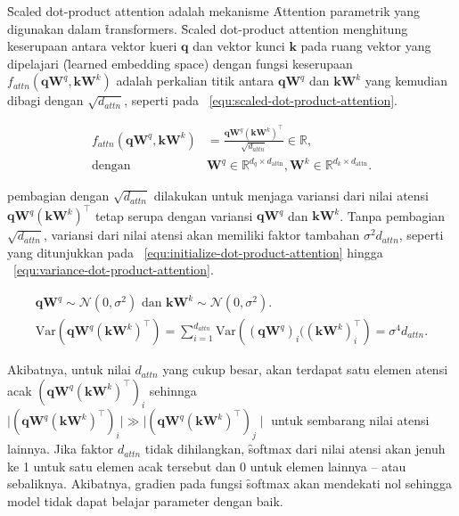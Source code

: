 	\f{Scaled dot-product attention} adalah mekanisme \f{Attention} parametrik yang digunakan dalam \f{transformers}. \f{Scaled dot-product attention} menghitung keserupaan antara vektor kueri $\mathbf{q}$ dan vektor kunci $\mathbf{k}$ pada ruang vektor yang dipelajari (\f{learned embedding space}) dengan fungsi keserupaan $f_{attn}(\mathbf{q} \mathbf{W}^q, \mathbf{k}\mathbf{W}^k) $ adalah perkalian titik antara $\mathbf{qW}^q$ dan $\mathbf{kW}^k$ yang kemudian dibagi dengan $\sqrt{d_{attn}}$, seperti pada \equ~\ref{equ:scaled-dot-product-attention}.

	\begin{align}
		\label{equ:scaled-dot-product-attention}
		f_{attn}(\mathbf{q} \mathbf{W}^q, \mathbf{k} \mathbf{W}^k) &= \frac{\mathbf{q} \mathbf{W}^q (\mathbf{k} \mathbf{W}^k)^{\top}}{\sqrt{d_{attn}}} \in \mathbb{R}, \\
		\text{dengan } &\mathbf{W}^q \in \mathbb{R}^{d_q \times d_{\text{attn}}}, \mathbf{W}^k \in \mathbb{R}^{d_k \times d_{\text{attn}}}.
	\end{align}

	pembagian dengan $\sqrt{d_{attn}}$ dilakukan untuk menjaga variansi dari nilai atensi $\mathbf{q} \mathbf{W}^q (\mathbf{k} \mathbf{W}^k)^{\top}$ tetap serupa dengan variansi $\mathbf{qW}^q$ dan $\mathbf{kW}^k$. Tanpa pembagian $\sqrt{d_{attn}}$, variansi dari nilai atensi akan memiliki faktor tambahan $\sigma^2 d_{attn}$, seperti yang ditunjukkan pada \equ~\ref{equ:initialize-dot-product-attention} hingga \equ~\ref{equ:variance-dot-product-attention}.

	\begin{align}
		\label{equ:initialize-dot-product-attention}
		\mathbf{qW}^q \sim \mathcal{N}(0, \sigma^2) \text{ dan } \mathbf{kW}^k \sim \mathcal{N}(0, \sigma^2). \\
		\label{equ:variance-dot-product-attention}
		\text{Var}(\mathbf{qW}^q (\mathbf{kW}^k)^{\top}) = \sum_{i=1}^{d_{attn}} \text{Var}\left((\mathbf{qW}^q)_i ((\mathbf{kW}^k)^{\top}_i\right) = \sigma^4 d_{attn}.
	\end{align}
	
	Akibatnya, untuk nilai $d_{attn}$ yang cukup besar, akan terdapat satu elemen atensi acak $(\mathbf{qW}^q (\mathbf{kW}^k)^{\top})_i$ sehinnga $\mid (\mathbf{qW}^q (\mathbf{kW}^k)^{\top})_i\mid \gg \mid(\mathbf{qW}^q (\mathbf{kW}^k)^{\top})_j\mid$ untuk sembarang nilai atensi lainnya. Jika faktor $d_{attn}$ tidak dihilangkan, \f{softmax} dari nilai atensi akan jenuh ke 1 untuk satu elemen acak tersebut dan 0 untuk elemen lainnya -- atau sebaliknya. Akibatnya, gradien pada fungsi \f{softmax} akan mendekati nol sehingga model tidak dapat belajar parameter dengan baik. 

